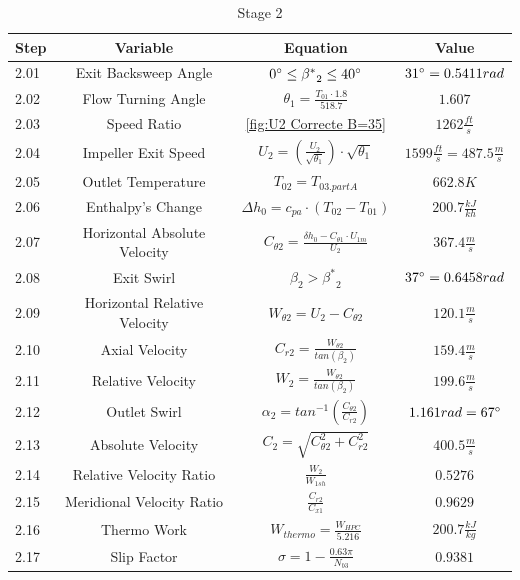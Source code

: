 \documentclass[12pt, letter]{report}
\begin{document}
\begin{table}[H]
    \centering
    \caption{Stage 2  \cite{lectureslides}}
    \begin{tabular}{|l|c|c|c|} \hline 
          \textbf{Step} &\textbf{Variable}&  \textbf{Equation}& \textbf{Value}\\ \hline 
         2.01&  Exit Backsweep Angle&  $0\degree \leq {\beta^*}_2 \leq 40\degree$& $31 \degree=0.5411rad$\\ \hline 
         2.02&  Flow Turning Angle&  $\theta_1=\frac{T_{01} \cdot 1.8}{518.7}$& $1.607$\\ \hline 
         2.03&  Speed Ratio&  \autoref{fig:U2 Correcte B=35}& $1262 \frac{ft}{s}$\\ \hline 
         2.04&  Impeller Exit Speed&  $U_2=(\frac{U_2}{\sqrt{\theta_1}}) \cdot \sqrt{\theta_1}$& $1599 \frac{ft}{s}= 487.5 \frac{m}{s}$\\ \hline 
         2.05&  Outlet Temperature&  $T_{02}=T_{03.partA}$& $662.8K$\\ \hline 
         2.06&  Enthalpy's Change&  $\Delta h_0=c_{pa} \cdot (T_{02}-T_{01})$& $200.7 \frac{kJ}{kh}$\\ \hline 
         2.07&  Horizontal Absolute Velocity&  $C_{\theta2}=\frac{\delta h_0-C_{\theta1} \cdot U_{1m}}{U_2}$& $367.4 \frac{m}{s}$\\ \hline 
         2.08&  Exit Swirl&  $\beta_2>{\beta^*}_2$& $37 \degree=0.6458rad$\\ \hline 
         2.09&  Horizontal Relative Velocity&  $W_{\theta2}=U_2-C_{\theta2}$& $120.1 \frac{m}{s}$\\ \hline
 2.10& Axial Velocity& $C_{r2}=\frac{W_{\theta2}}{tan(\beta_2)}$& $159.4 \frac{m}{s}$\\\hline
 2.11& Relative Velocity& $W_2=\frac{W_{\theta2}}{tan(\beta_2)}$& $199.6 \frac{m}{s}$\\\hline
 2.12& Outlet Swirl& $\alpha_2=tan^{-1} (\frac{C_{\theta2}}{C_{r2}})$& $1.161rad=67 \degree$\\\hline
 2.13& Absolute Velocity& $C_2=\sqrt{C_{\theta2}^2+C_{r2}^2}$& $400.5 \frac{m}{s}$\\\hline
 2.14& Relative Velocity Ratio& $\frac{W_2}{W_{1sh}}$& $0.5276$\\\hline
 2.15& Meridional Velocity Ratio& $\frac{C_{r2}}{C_{x1}}$& $0.9629$\\\hline
 2.16& Thermo Work& $W_{thermo}=\frac{W_{HPC}}{5.216}$& $200.7 \frac{kJ}{kg}$\\\hline
 2.17& Slip Factor& $\sigma=1-\frac{0.63 \pi}{N_{b3}}$& $0.9381$\\\hline

\end{tabular}
\end{table}
\end{document}
